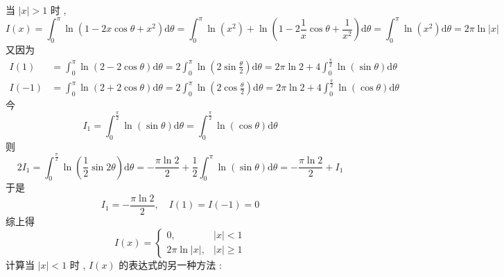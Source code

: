\documentclass[10pt]{article}
\begin{document}
{ 当  $|x|>1$  时 ,
$$
I(x)=\int_{0}^{\pi} \ln \left(1-2 x \cos \theta+x^{2}\right) \mathrm{d} \theta=\int_{0}^{\pi} \ln \left(x^{2}\right)+\ln \left(1-2 \frac{1}{x} \cos \theta+\frac{1}{x^{2}}\right) \mathrm{d} \theta=\int_{0}^{\pi} \ln \left(x^{2}\right) \mathrm{d} \theta=2 \pi \ln |x|
$$
 又因为 
$$
\begin{aligned}
I(1) &=\int_{0}^{\pi} \ln (2-2 \cos \theta) \mathrm{d} \theta=2 \int_{0}^{\pi} \ln \left(2 \sin \frac{\theta}{2}\right) \mathrm{d} \theta=2 \pi \ln 2+4 \int_{0}^{\frac{\pi}{2}} \ln (\sin \theta) \mathrm{d} \theta \\
I(-1) &=\int_{0}^{\pi} \ln (2+2 \cos \theta) \mathrm{d} \theta=2 \int_{0}^{\pi} \ln \left(2 \cos \frac{\theta}{2}\right) \mathrm{d} \theta=2 \pi \ln 2+4 \int_{0}^{\frac{\pi}{2}} \ln (\cos \theta) \mathrm{d} \theta
\end{aligned}
$$
 今 
$$
I_{1}=\int_{0}^{\frac{\pi}{2}} \ln (\sin \theta) \mathrm{d} \theta=\int_{0}^{\frac{\pi}{2}} \ln (\cos \theta) \mathrm{d} \theta
$$
 则 
$$
2 I_{1}=\int_{0}^{\frac{\pi}{2}} \ln \left(\frac{1}{2} \sin 2 \theta\right) \mathrm{d} \theta=-\frac{\pi \ln 2}{2}+\frac{1}{2} \int_{0}^{\pi} \ln (\sin \theta) \mathrm{d} \theta=-\frac{\pi \ln 2}{2}+I_{1}
$$
 于是 
$$
I_{1}=-\frac{\pi \ln 2}{2}, \quad I(1)=I(-1)=0
$$
 综上得 
$$
I(x)= \begin{cases}0, & |x|<1 \\ 2 \pi \ln |x|, & |x| \geqslant 1\end{cases}
$$
 计算当  $|x|<1$  时 , $I(x)$  的表达式的另一种方法 :

}
\end{document}
